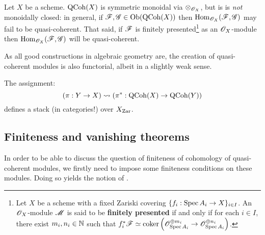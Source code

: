             \begin{proposition} \label{prop: qcoh_monoidal_properties}
                Let $X$ be a scheme. $\mathrm{QCoh}(X)$ is symmetric monoidal via $\tensor_{\scrO_X}$, but is is \textit{not} monoidally closed: in general, if $\mathscr{F}, \mathscr{G} \in \mathrm{Ob}(\mathrm{QCoh}(X))$ then $\mathrm{Hom}_{\mathscr{O}_X}(\mathscr{F}, \mathscr{G})$ may fail to be quasi-coherent. That said, if $\mathscr{F}$ is finitely presented\footnote{Let $X$ be a scheme with a fixed Zariski covering $\{ f_i: \operatorname{Spec} A_i \to X \}_{i \in I}$. An $\mathscr{O}_X$-module $\mathscr{M}$ is said to be \textbf{finitely presented} if and only if for each $i \in I$, there exist $m_i, n_i \in \mathbb{N}$ such that $f_i^*\mathscr{F} \simeq \operatorname{coker}\left( \mathscr{O}_{\operatorname{Spec} A_i}^{\oplus m_i} \to \mathscr{O}_{\operatorname{Spec} A_i}^{\oplus n_i} \right)$.} as an $\mathscr{O}_X$-module then $\mathrm{Hom}_{\mathscr{O}_X}(\mathscr{F}, \mathscr{G})$ will be quasi-coherent. 
            \end{proposition}
            As all good constructions in algebraic geometry are, the creation of quasi-coherent modules is also functorial, albeit in a slightly weak sense. 
            \begin{proposition} \label{prop: qcoh_functoriality}
                The assignment:
                    $$(\pi: Y \to X) \leadsto ( \pi^*: \mathrm{QCoh}(X) \to \mathrm{QCoh}(Y) )$$
                defines a stack (in categories!) over $X_{\mathrm{Zar}}$. 
            \end{proposition}

        \subsection{Finiteness and vanishing theorems}
            In order to be able to discuss the question of finiteness of cohomology of quasi-coherent modules, we firstly need to impose some finiteness conditions on these modules. Doing so yields the notion of .
        
